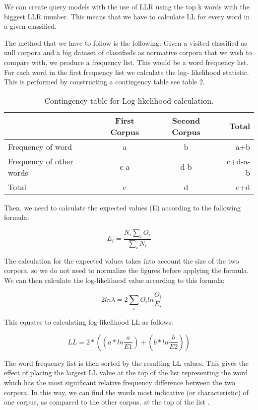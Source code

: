 We can create query models with the use of LLR using the top k words with the biggest LLR number. This means that we have to calculate LL for every word in a given classified.

The method that we have to follow is the following:
Given a visited classified as null corpora and a big dataset of classifieds as normative corpora that we wish to compare with, we produce a frequency list. This would be a word frequency list. For each word in the first frequency list we calculate the log- likelihood statistic. This is performed by constructing a contingency table see table 2.


\begin{table}[H]
\begin{center}
\footnotesize
\caption{Contingency table for Log likelihood calculation.}
\begin{tabular}{lccr}
\toprule
&  First Corpus & Second Corpus & Total \\
\midrule
Frequency of word & a &	b & a+b \\
Frequency of other words & c-a & d-b & c+d-a-b \\
Total & c & d & c+d \\
\bottomrule
\end{tabular}
\end{center}
\end{table}

Then, we need to calculate the expected values (E) according to the following formula:

\begin{equation}
E_i= \frac{N_{i}\sum_{i}{O_{i}}}{\sum_{i}{N_{i}}}
\end{equation}

The calculation for the expected values takes into account the size of the two corpora, so we do not need to normalize the figures before applying the formula. We can then calculate the log-likelihood value according to this formula:

\begin{equation}
-2ln\lambda=2\sum_{i}{O_{i}}{ln \frac{O_{i}}{E_{i}}}
\end{equation}

This equates to calculating log-likelihood LL as follows:

\begin{equation}
LL =2*((a*ln \frac{a}{E1}) + (b*ln \frac{b}{E2}))
\end{equation}

The word frequency list is then sorted by the resulting LL values. This gives the effect of placing the largest LL value at the top of the list representing the word which has the most significant relative frequency difference between the two corpora. In this way, we can find the words most indicative (or characteristic) of one corpus, as compared to the other corpus, at the top of the list \cite{RaysonGarside}.


